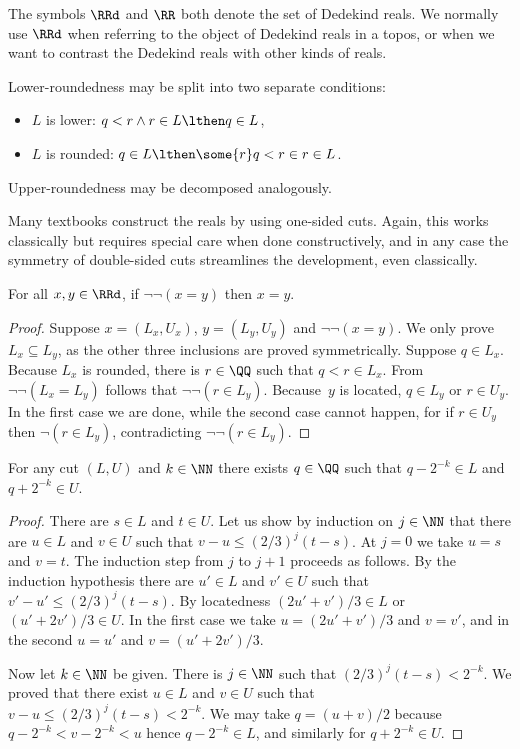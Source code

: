 The symbols $\RRd$ and $\RR$ both denote the set of Dedekind reals. We normally use $\RRd$ when referring to the object of Dedekind reals in a topos, or when we want to contrast the Dedekind reals with other kinds of reals.

Lower-roundedness may be split into two separate conditions:
%
\begin{itemize}
\item $L$ is lower: $q < r \land r \in L \lthen q \in L$,
\item $L$ is rounded: $q \in L \lthen \some{r} q < r \in r \in L$.
\end{itemize}
%
Upper-roundedness may be decomposed analogously.

Many textbooks construct the reals by using one-sided cuts. Again, this works classically but requires special care when done constructively, and in any case the symmetry of double-sided cuts streamlines the development, even classically. 

\begin{propositionC}
  \label{prop:RRd-stable-equality}%
  For all $x, y \in \RRd$, if $\lnot\lnot (x = y)$ then $x = y$.
\end{propositionC}

\begin{proof}
  Suppose $x = (L_x, U_x)$, $y = (L_y, U_y)$ and $\lnot\lnot(x = y)$.
  We only prove $L_x \subseteq L_y$, as the other three inclusions are proved symmetrically.
  Suppose $q \in L_x$. Because $L_x$ is rounded, there is $r \in \QQ$ such that $q < r \in L_x$.
  From $\lnot\lnot (L_x = L_y)$ follows that $\lnot\lnot (r \in L_y)$.
  Because~$y$ is located, $q \in L_y$ or $r \in U_y$. In the first case we are done, while the second case cannot happen, for if $r \in U_y$ then $\lnot (r \in L_y)$, contradicting $\lnot\lnot (r \in L_y)$.
\end{proof}

\begin{propositionC}
  \label{prop:stradle-closelyd}
  For any cut $(L, U)$ and $k \in \NN$ there exists $q \in \QQ$ such that $q - 2^{-k} \in L$ and $q + 2^{-k} \in U$.
\end{propositionC}

\begin{proof}
  There are $s \in L$ and $t \in U$. Let us show by induction on $j \in \NN$ that there are $u \in L$ and $v \in U$ such that $v - u \leq (2/3)^j (t - s)$. At $j = 0$ we take $u = s$ and $v = t$.
  The induction step from $j$ to $j+1$ proceeds as follows. By the induction hypothesis there are $u' \in L$ and $v' \in U$ such that $v' - u' \leq (2/3)^j (t - s)$. By locatedness $(2 u' + v')/3 \in L$ or $(u' + 2 v')/3 \in U$. In the first case we take $u = (2 u' + v')/3$ and $v = v'$, and in the second $u = u'$ and $v = (u' + 2 v')/3$.

  Now let $k \in \NN$ be given. There is $j \in \NN$ such that $(2/3)^j (t - s) < 2^{-k}$. We proved that there exist $u \in L$ and $v \in U$ such that $v - u \leq (2/3)^j (t - s) < 2^{-k}$. We may take $q = (u + v)/2$ because
  $q - 2^{-k} < v - 2^{-k} < u$ hence $q - 2^{-k} \in L$, and similarly for $q + 2^{-k} \in U$.
\end{proof}

